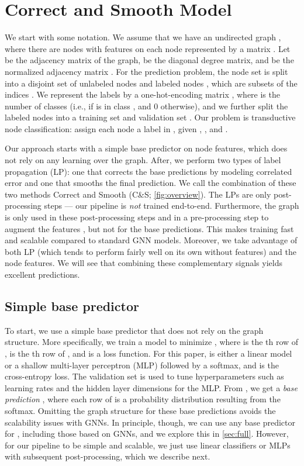 \documentclass{article}
\newcommand{\framework}{C\&S}
\begin{document}
\section{Correct and Smooth Model}\label{sec:basic}

We start with some notation.
We assume that we have an undirected graph , where there are  nodes
with features on each node represented by a matrix .
Let  be the adjacency matrix of the graph,  be the diagonal degree matrix, and
 be the normalized adjacency matrix .
For the prediction problem, the node set  is split into a disjoint set of unlabeled nodes  and labeled nodes ,
which are subsets of the indices .
We represent the labels by a one-hot-encoding matrix , where  is the number of classes
(i.e.,  if  is in class , and 0 otherwise), and
we further split the labeled nodes into a training set  and validation set .
Our problem is transductive node classification: 
assign each node  a label in , given , , and .

Our approach starts with a simple base predictor on node features, which does not rely on any learning over the graph.
After, we perform two types of label propagation (LP): one that corrects the base predictions by modeling correlated error
and one that smooths the final prediction. We call the combination of these two methods Correct and Smooth (\framework{}; \cref{fig:overview}).
The LPs are only post-processing steps --- our pipeline is \emph{not} trained end-to-end.
Furthermore, the graph is only used in these post-processing steps and in a pre-processing step to augment the features , 
but not for the base predictions.
This makes training fast and scalable compared to standard GNN models.
Moreover, we take advantage of both LP (which tends to perform fairly well on its own without features)
and the node features.
We will see that combining these complementary signals yields excellent predictions.


\subsection{Simple base predictor}
To start, we use a simple base predictor that does not rely on the graph structure.
More specifically, we train a model  to minimize , where  is the th row of ,
 is the th row of , and  is a loss function. 
For this paper,  is either a linear model or a shallow multi-layer perceptron (MLP) followed by a softmax, and  is the cross-entropy loss.
The validation set  is used to tune hyperparameters such as learning rates and the hidden layer dimensions for the MLP.
From , we get a \emph{base prediction} ,
where each row of  is a probability distribution resulting from the softmax.
Omitting the graph structure for these base predictions avoids the scalability issues with GNNs.
In principle, though, we can use any base predictor for , including those based on GNNs,
and we explore this in \cref{sec:full}. 
However, for our pipeline to be simple and scalable,
we just use linear classifiers or MLPs with subsequent post-processing, which we describe next.
\end{document}
